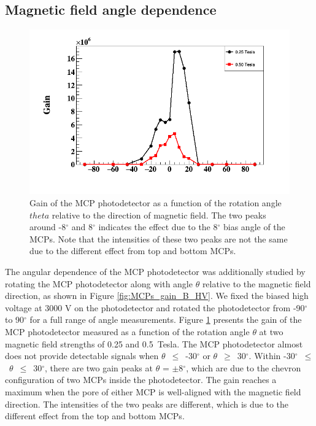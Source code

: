 \documentclass[preprint,5p]{elsarticle}
\begin{document}
\subsection{Magnetic field angle dependence}\label{subsec_theta}

\begin{figure}[tbp]
\centering 
\includegraphics[scale=0.35]{fig/MCPs_gain_theta_B.png}
\caption{Gain of the MCP photodetector as a function of the rotation angle 
   $theta$ relative to the direction of magnetic field. The two peaks around 
-8$^{\circ}$ and 8$^{\circ}$ indicates the effect due to the 8$^{\circ}$ bias 
angle of the MCPs. Note that the intensities of these two peaks are not the 
same due to the different effect from top and bottom MCPs.} 
\label{fig:MCPs_gain_theta_B}
\end{figure}
The angular dependence of the MCP photodetector was additionally studied by 
rotating the MCP photodetector along with angle $\theta$ relative to the 
magnetic field direction, as shown in Figure \ref{fig:MCPs_gain_B_HV}. We fixed 
the biased high voltage at 3000 V on the photodetector and rotated the 
photodetector from -90$^{\circ}$ to 90$^{\circ}$ for a full range of angle 
measurements. Figure \ref{fig:MCPs_gain_theta_B} presents the gain of the MCP 
photodetector measured as a function of the rotation angle $\theta$ at two 
magnetic field strengths of 0.25 and 0.5~Tesla. The MCP photodetector almost 
does not provide detectable signals when $\theta$~$\leq$~-30$^{\circ}$ or 
$\theta$~$\geq$~30$^{\circ}$.  Within 
-30$^{\circ}$~$\leq$~$\theta$~$\leq$~30$^{\circ}$, there are two gain peaks at 
$\theta$ = $\pm$8$^{\circ}$, which are due to the chevron configuration of two 
MCPs inside the photodetector. The gain reaches a maximum when the pore of 
either MCP is well-aligned with the magnetic field direction. The intensities 
of the two peaks are different, which is due to the different effect from the 
top and bottom MCPs.
\end{document}
